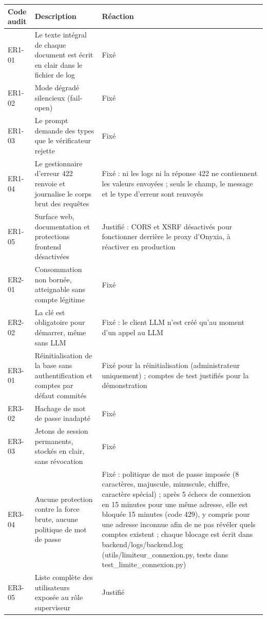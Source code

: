 \documentclass[12pt,a4paper]{article}
\begin{document}
\begin{longtable}{|>{\raggedright\arraybackslash}p{1.5cm}|
                  >{\raggedright\arraybackslash}p{6cm}|
                  >{\raggedright\arraybackslash}p{8cm}|}
\hline
\textbf{Code audit} & \textbf{Description} & \textbf{Réaction} \\
\hline
ER1-01 & Le texte intégral de chaque document est écrit en clair dans le fichier de log & Fixé \\
\hline
ER1-02 & Mode dégradé silencieux (fail-open) & Fixé \\
\hline
ER1-03 & Le prompt demande des types que le vérificateur rejette & Fixé \\
\hline
ER1-04 & Le gestionnaire d'erreur 422 renvoie et journalise le corps brut des requêtes & Fixé : ni les logs ni la réponse 422 ne contiennent les valeurs envoyées ; seuls le champ, le message et le type d'erreur sont renvoyés \\
\hline
ER1-05 & Surface web, documentation et protections frontend désactivées & Justifié : CORS et XSRF désactivés pour fonctionner derrière le proxy d'Onyxia, à réactiver en production \\
\hline
ER2-01 & Consommation non bornée, atteignable sans compte légitime & Fixé \\
\hline
ER2-02 & La clé est obligatoire pour démarrer, même sans LLM & Fixé : le client LLM n'est créé qu'au moment d'un appel au LLM \\
\hline
ER3-01 & Réinitialisation de la base sans authentification et comptes par défaut commités & Fixé pour la réinitialisation (administrateur uniquement) ; comptes de test justifiés pour la démonstration \\
\hline
ER3-02 & Hachage de mot de passe inadapté & Fixé \\
\hline
ER3-03 & Jetons de session permanents, stockés en clair, sans révocation & Fixé \\
\hline
ER3-04 & Aucune protection contre la force brute, aucune politique de mot de passe & Fixé : politique de mot de passe imposée (8 caractères, majuscule, minuscule, chiffre, caractère spécial) ; après 5 échecs de connexion en 15 minutes pour une même adresse, elle est bloquée 15 minutes (code 429), y compris pour une adresse inconnue afin de ne pas révéler quels comptes existent ; chaque blocage est écrit dans backend/logs/backend.log (utils/limiteur\_connexion.py, tests dans test\_limite\_connexion.py) \\
\hline
ER3-05 & Liste complète des utilisateurs exposée au rôle superviseur & Justifié \\

\end{longtable}
\end{document}
